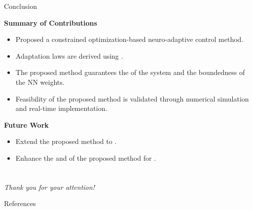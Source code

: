 \documentclass[8pt, aspectratio=169]{beamer}
\newcommand{\ctxt}[2]{\color{#1}{#2}\color{black}}
\begin{document}
\begin{frame}{Conclusion}
    
  \textbf{Summary of Contributions}
  \begin{itemize}
    \item Proposed a constrained optimization-based neuro-adaptive control method.
    \item Adaptation laws are derived using \ctxt{airforceblue}{constrained optimization method}.
    \item The proposed method guarantees the \ctxt{awesome}{stability }of the system and the boundedness of the NN weights.
    \item Feasibility of the proposed method is validated through numerical simulation and real-time implementation.
  \end{itemize}

  \textbf{Future Work}
  \begin{itemize}
    \item Extend the proposed method to \ctxt{airforceblue}{state constraints}.
    \item Enhance the \ctxt{awesome}{robustness }and \ctxt{awesome}{flexibility }of the proposed method for \ctxt{airforceblue}{various systems}.
  \end{itemize}

\end{frame}


\section{}
\begin{frame}{}
    \centering \Large
    \emph{Thank you for your attention!}
\end{frame}

\begin{frame}[allowframebreaks]{References}

  
  

\end{frame}
\end{document}
